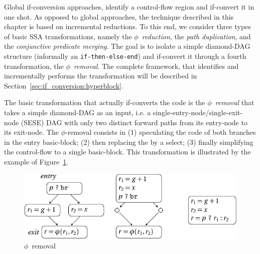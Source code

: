Global if-conversion approaches, identify a control-flow region and if-convert it in one shot. As opposed to global approaches, the technique described in this chapter is based on incremental reductions. To this end, we consider three types of basic SSA transformations, namely the \emph{$\phi$~reduction}, the \emph{path duplication}, and the \emph{conjunctive predicate merging}. The goal is to isolate a simple diamond-DAG structure (informally an \texttt{if-then-else-end}) and if-convert it through a fourth transformation, the \emph{$\phi$~removal}. The complete framework, that identifies and incrementally performs the transformation will be described in Section~\ref{sec:if_conversion:hyperblock}. 


The basic transformation that actually if-converts the code is the \emph{$\phi$~removal} that takes a simple diamond-DAG  as an input, i.e. a single-entry-node/single-exit-node (SESE) DAG with only two distinct forward paths from its entry-node to its exit-node. The $\phi$-removal consists in (1) speculating the code of both branches in the entry basic-block; (2) then replacing the \phifun by a select; (3) finally simplifying the control-flow to a single basic-block. This transformation is illustrated by the example of Figure~\ref{fig:phi_rem}. 
\begin{figure}[h]
  \includegraphics[scale=0.9]{phi_removal}
  \caption{$\phi$~removal\label{fig:phi_rem}}
\end{figure}


